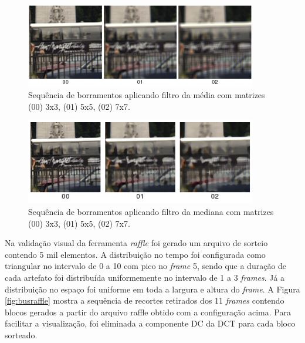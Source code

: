 \begin{figure}[!htb]
	\centering
	\includegraphics[width=0.9\textwidth]{./imgs/bluraverage.png}
	\caption[Sequência de borramentos aplicando filtro da média]{Sequência de borramentos aplicando filtro da média com matrizes (00) 3x3, (01) 5x5, (02) 7x7.}
	\label{fig:bluraverage}
\end{figure}

\begin{figure}[!htb]
	\centering
	\includegraphics[width=0.9\textwidth]{./imgs/blurmedian.png}
	\caption[Sequência de borramentos aplicando filtro da mediana]{Sequência de borramentos aplicando filtro da mediana com matrizes (00) 3x3, (01) 5x5, (02) 7x7.}
	\label{fig:blurmedian}
\end{figure}

Na validação visual da ferramenta \emph{raffle} foi gerado um arquivo de sorteio contendo 5 mil elementos.
A distribuição no tempo foi configurada como triangular no intervalo de 0 a 10 com pico no \emph{frame} 5, sendo que a duração de cada artefato foi distribuída uniformemente no intervalo de 1 a 3 \emph{frames}.
Já a distribuição no espaço foi uniforme em toda a largura e altura do \emph{frame}. 
A Figura \ref{fig:busraffle} mostra a sequência de recortes retirados dos 11 \emph{frames} contendo blocos gerados a partir do arquivo raffle obtido com a configuração acima. Para facilitar a visualização, foi eliminada a componente DC da DCT para cada bloco sorteado.

